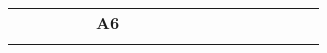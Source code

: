 \begin{landscape}
\begin{table}[h!]
\begin{tabular}{lcllcllcllcllcllcl}
\multicolumn{1}{l|}{}     & \multicolumn{1}{c|}{}                                                                                                   &                              & \multicolumn{1}{l|}{}   & \multicolumn{1}{c|}{}                                                                                                      & {\bf A6}                      & \multicolumn{1}{l|}{}   & \multicolumn{1}{c|}{}                                                                                                   &                               & \multicolumn{1}{l|}{}   & \multicolumn{1}{c|}{}                                                                                            &                               & \multicolumn{1}{l|}{}   & \multicolumn{1}{c|}{}                                                                                                              &                               & \multicolumn{1}{l|}{}   & \multicolumn{1}{c|}{}                                                                                                        &                               \\
\multicolumn{1}{l|}{}     & \multicolumn{1}{c|}{}                                                                                                   &                              & \multicolumn{1}{l|}{}   & \multicolumn{1}{c|}{}                                                                                                      &                               & \multicolumn{1}{l|}{}   & \multicolumn{1}{c|}{}                                                                                                   &                               & \multicolumn{1}{l|}{}   & \multicolumn{1}{c|}{}                                                                                            &                               & \multicolumn{1}{l|}{}   & \multicolumn{1}{c|}{}                                                                                                              &                               & \multicolumn{1}{l|}{}   & \multicolumn{1}{c|}{}                                                                                                        &                               \\ \cline{1-1} \cline{3-4} \cline{6-7} \cline{9-10} \cline{12-13} \cline{15-16} \cline{18-18} 

\end{tabular}
\end{table}
\end{landscape}
